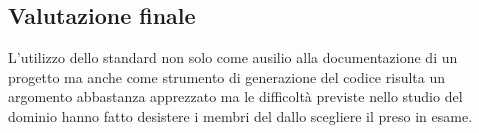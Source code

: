 \subsection {Valutazione finale}
L’utilizzo dello standard  non solo come ausilio alla documentazione di un progetto ma anche come strumento di generazione del codice risulta un argomento abbastanza apprezzato ma le difficoltà previste nello studio del dominio hanno fatto desistere i membri del  dallo scegliere il  preso in esame.
